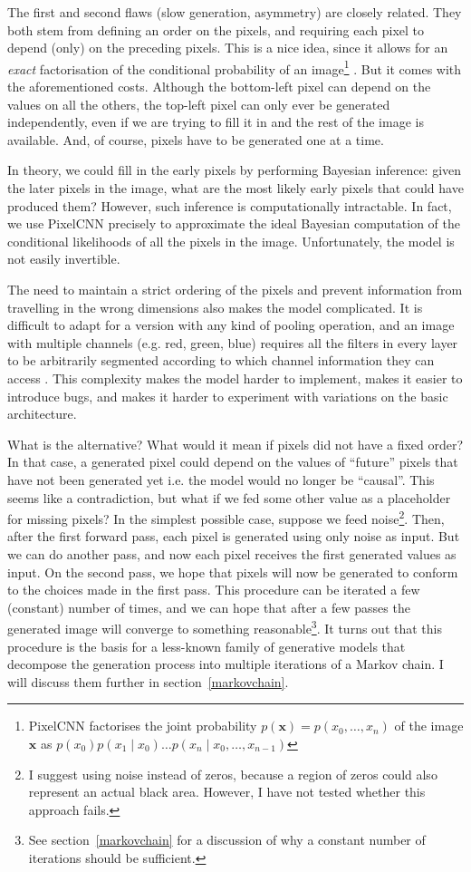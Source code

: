 \documentclass[11pt, a4paper, openany]{book}
\newcommand{\vect}[1]{\mathbf{#1}}
\newcommand{\nquote}[1]{``{#1}''}
\begin{document}
The first and second flaws (slow generation, asymmetry) are closely related. They both stem from defining an order on the pixels, and requiring each pixel to depend (only) on the preceding pixels. This is a nice idea, since it allows for an \emph{exact} factorisation of the conditional probability of an image\footnote{PixelCNN factorises the joint probability $p(\vect{x})=p(x_0,\dots,x_n)$ of the image $\vect{x}$ as $p(x_0)p(x_1\mid x_0)\dots p(x_n\mid x_0,\dots,x_{n-1})$} \citep{pixelcnn1}. But it comes with the aforementioned costs. Although the bottom-left pixel can depend on the values on all the others, the top-left pixel can only ever be generated independently, even if we are trying to fill it in and the rest of the image is available. And, of course, pixels have to be generated one at a time.

In theory, we could fill in the early pixels by performing Bayesian inference: given the later pixels in the image, what are the most likely early pixels that could have produced them? However, such inference is computationally intractable. In fact, we use PixelCNN precisely to approximate the ideal Bayesian computation of the conditional likelihoods of all the pixels in the image. Unfortunately, the model is not easily invertible.

The need to maintain a strict ordering of the pixels and prevent information from travelling in the wrong dimensions also makes the model complicated. It is difficult to adapt for a version with any kind of pooling operation, and an image with multiple channels (e.g. red, green, blue) requires all the filters in every layer to be arbitrarily segmented according to which channel information they can access \citep{pixelcnn2}. This complexity makes the model harder to implement, makes it easier to introduce bugs, and makes it harder to experiment with variations on the basic architecture.

What is the alternative? What would it mean if pixels did not have a fixed order? In that case, a generated pixel could depend on the values of \nquote{future} pixels that have not been generated yet i.e. the model would no longer be \nquote{causal}. This seems like a contradiction, but what if we fed some other value as a placeholder for missing pixels? In the simplest possible case, suppose we feed noise\footnote{I suggest using noise instead of zeros, because a region of zeros could also represent an actual black area. However, I have not tested whether this approach fails.}. Then, after the first forward pass, each pixel is generated using only noise as input. But we can do another pass, and now each pixel receives the first generated values as input. On the second pass, we hope that pixels will now be generated to conform to the choices made in the first pass. This procedure can be iterated a few (constant) number of times, and we can hope that after a few passes the generated image will converge to something reasonable\footnote{See section~\ref{markovchain} for a discussion of why a constant number of iterations should be sufficient.}. It turns out that this procedure is the basis for a less-known family of generative models that decompose the generation process into multiple iterations of a Markov chain. I will discuss them further in section~\ref{markovchain}.
\end{document}
